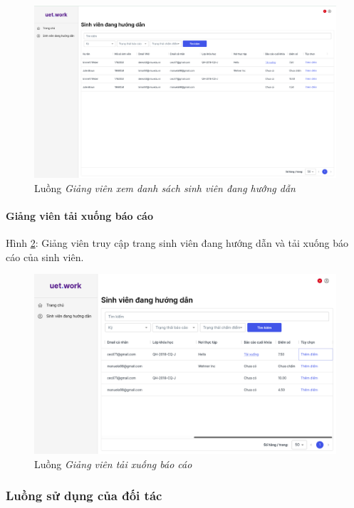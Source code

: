 \documentclass[./../main.tex]{subfiles}
\begin{document}
\begin{figure}[]
	\includegraphics[width=\linewidth]{./images/image8.png}
	\caption{Luồng \emph{Giảng viên xem danh sách sinh viên đang hướng dẫn}}
	\label{fig:working_student_page}
\end{figure}

\paragraph*{Giảng viên tải xuống báo cáo}
Hình \ref{fig:lecturer_access_students}: Giảng viên truy cập trang sinh viên đang hướng dẫn và tải xuống báo cáo của sinh viên.

\begin{figure}[]
	\includegraphics[width=\linewidth]{./images/image64.png}
	\caption{Luồng \emph{Giảng viên tải xuống báo cáo}}
	\label{fig:lecturer_access_students}
\end{figure}

\subsubsection{Luồng sử dụng của đối tác}
\end{document}
